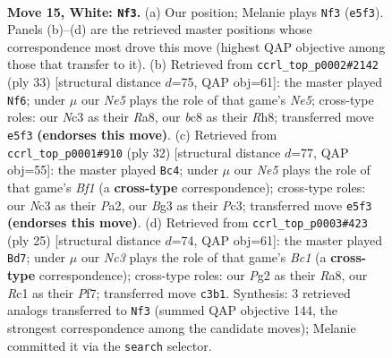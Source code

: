 \documentclass[11pt]{article}
\begin{document}
\clearpage

\begin{figure}[p]\centering
\begin{subfigure}{0.46\textwidth}\centering
\resizebox{\linewidth}{!}{%
\newchessgame
\chessboard[
  setfen={rnbr2k1/5p2/1p2pn2/p1b1N1pp/2B5/2N1P1B1/PP3PPP/R1R3K1 w - - 0 15},
  showmover=false,
  pgfstyle=straightmove, color=movearrow, markmove={e5-f3}
]}
\caption{}
\end{subfigure}\hfill
\begin{subfigure}{0.46\textwidth}\centering
\resizebox{\linewidth}{!}{%
\newchessgame
\chessboard[
  setfen={r6r/p3kp2/1p1bp2p/2pb4/P3n3/4BNP1/1P2PPBP/R2R2K1 b - - 0 17},
  showmover=false,
  pgfstyle=straightmove, color=movearrow, markmove={e4-f6}
]}
\caption{}
\end{subfigure}
\\[4pt]
\begin{subfigure}{0.46\textwidth}\centering
\resizebox{\linewidth}{!}{%
\newchessgame
\chessboard[
  setfen={r3kb1r/1p3pp1/p3pn2/4Nb1p/3B4/2P2P1P/PP4P1/R3KB1R w KQkq - 1 17},
  showmover=false,
  pgfstyle=straightmove, color=movearrow, markmove={f1-c4}
]}
\caption{}
\end{subfigure}\hfill
\begin{subfigure}{0.46\textwidth}\centering
\resizebox{\linewidth}{!}{%
\newchessgame
\chessboard[
  setfen={r1b4r/1p2kppp/p2b1p2/2nP4/P1B2P2/5N2/1PP3PP/R1B1K2R b KQ - 1 13},
  showmover=false,
  pgfstyle=straightmove, color=movearrow, markmove={c8-d7}
]}
\caption{}
\end{subfigure}
\caption{\textbf{Move 15, White: \texttt{Nf3}.} (a) Our position; Melanie plays \texttt{Nf3} (\texttt{e5f3}). Panels (b)--(d) are the retrieved master positions whose correspondence most drove this move (highest QAP objective among those that transfer to it). (b) Retrieved from \texttt{ccrl\_top\_p0002\#2142} (ply 33) [structural distance $d$=75, QAP obj=61]: the master played \texttt{Nf6}; under $\mu$ our \emph{Ne5} plays the role of that game's \emph{Ne5}; cross-type roles: our \emph{N}c3 as their \emph{R}a8, our \emph{b}c8 as their \emph{R}h8; transferred move \texttt{e5f3} \textbf{(endorses this move)}. (c) Retrieved from \texttt{ccrl\_top\_p0001\#910} (ply 32) [structural distance $d$=77, QAP obj=55]: the master played \texttt{Bc4}; under $\mu$ our \emph{Ne5} plays the role of that game's \emph{Bf1} (a \textbf{cross-type} correspondence); cross-type roles: our \emph{N}c3 as their \emph{P}a2, our \emph{B}g3 as their \emph{P}c3; transferred move \texttt{e5f3} \textbf{(endorses this move)}. (d) Retrieved from \texttt{ccrl\_top\_p0003\#423} (ply 25) [structural distance $d$=74, QAP obj=61]: the master played \texttt{Bd7}; under $\mu$ our \emph{Nc3} plays the role of that game's \emph{Bc1} (a \textbf{cross-type} correspondence); cross-type roles: our \emph{P}g2 as their \emph{R}a8, our \emph{R}c1 as their \emph{P}f7; transferred move \texttt{c3b1}. Synthesis: 3 retrieved analogs transferred to \texttt{Nf3} (summed QAP objective 144, the strongest correspondence among the candidate moves); Melanie committed it via the \texttt{search} selector.}
\label{fig:thought-m28}
\end{figure}
\end{document}
